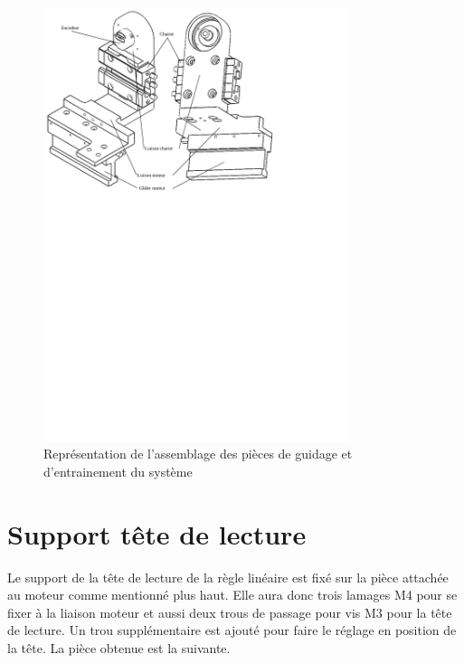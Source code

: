 \begin{figure}[H]
    \centering
    \includegraphics[width = 0.8\textwidth]{assets/figures/AssemblageGuidageEntrainement.svg}
    \caption{Représentation de l'assemblage des pièces de guidage et d'entrainement du système}
    \label{fig:AssGuiEntr}
\end{figure}

\section{Support tête de lecture}\label{sec:SupTeteLect}
Le support de la tête de lecture de la règle linéaire est fixé sur la pièce attachée au moteur comme mentionné plus haut. Elle aura donc trois
lamages M4 pour se fixer à la liaison moteur et aussi deux trous de passage pour vis M3 pour la tête de lecture. Un trou supplémentaire est ajouté
pour faire le réglage en position de la tête. La pièce obtenue est la suivante.

